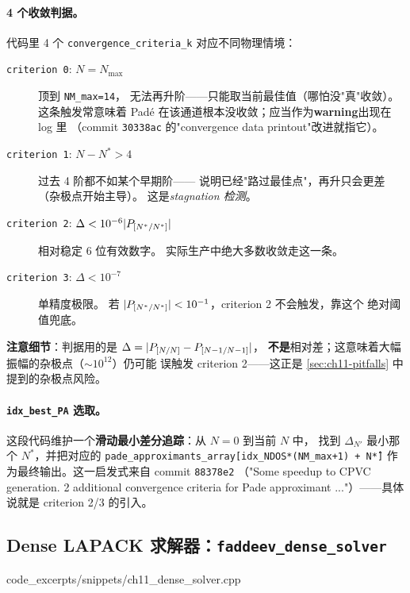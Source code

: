 \paragraph{4 个收敛判据。}
代码里 4 个 \texttt{convergence\_criteria\_k} 对应不同物理情境：
\begin{description}
  \item[\texttt{criterion 0}: \(N = N_{\max}\)] 顶到 \texttt{NM\_max=14}，
        无法再升阶——只能取当前最佳值（哪怕没"真"收敛）。这条触发常意味着
        Padé 在该通道根本没收敛；应当作为\textbf{warning}出现在 log 里
        （commit \texttt{30338ac} 的"convergence data printout"改进就指它）。
  \item[\texttt{criterion 1}: \(N - N^* > 4\)] 过去 4 阶都不如某个早期阶——
        说明已经"路过最佳点"，再升只会更差（杂极点开始主导）。
        这是\emph{stagnation 检测}。
  \item[\texttt{criterion 2}: \(\Delta < 10^{-6}|P_{[N^*/N^*]}|\)] 相对稳定 6 位有效数字。
        实际生产中绝大多数收敛走这一条。
  \item[\texttt{criterion 3}: \(\Delta < 10^{-7}\)] 单精度极限。
        若 \(|P_{[N^*/N^*]}| < 10^{-1}\)，criterion 2 不会触发，靠这个
        绝对阈值兜底。
\end{description}
\textbf{注意细节}：判据用的是 \(\Delta = |P_{[N/N]} - P_{[N-1/N-1]}|\)，
\textbf{不是}相对差；这意味着大幅振幅的杂极点（\(\sim 10^{12}\)）仍可能
误触发 criterion 2——这正是 \cref{sec:ch11-pitfalls} 中提到的杂极点风险。

\paragraph{\texttt{idx\_best\_PA} 选取。}
这段代码维护一个\textbf{滑动最小差分追踪}：从 \(N=0\) 到当前 \(N\) 中，
找到 \(\Delta_{N'}\) 最小那个 \(N^*\)，并把对应的
\texttt{pade\_approximants\_array[idx\_NDOS*(NM\_max+1) + N\^*]}
作为最终输出。这一启发式来自 commit \texttt{88378e2}
（"Some speedup to CPVC generation. 2 additional convergence criteria for
Pade approximant ..."）——具体说就是 criterion 2/3 的引入。

\subsection{Dense LAPACK 求解器：\texttt{faddeev\_dense\_solver}}
\label{subsec:ch11-dense-solver}


  {code_excerpts/snippets/ch11_dense_solver.cpp}

